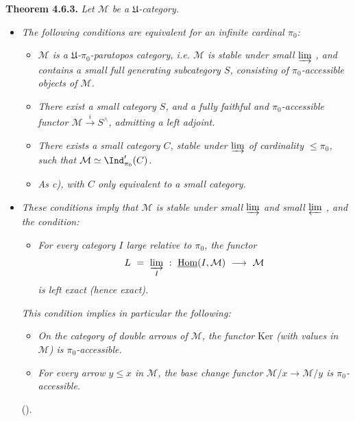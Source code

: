 \textbf{Theorem 4.6.3.} \textit{Let $\mathcal{M}$ be a $\mathfrak{U}$-category.}
\begin{itemize}[leftmargin=2.5em]
\item[\circled{1\textsuperscript{\textit{o}}}] \textit{The following conditions are equivalent for an infinite cardinal $\pi_0$:}
\begin{itemize}[leftmargin=3em]
\item[$a_{\pi_0}$\textit{)}] \textit{$\mathcal{M}$ is a $\mathfrak{U}$-$\pi_0$-paratopos category, i.e. $\mathcal{M}$ is stable under small $\varinjlim$ , and contains a small full} \textit{generating subcategory $S$, consisting of $\pi_0$-accessible objects of $\mathcal{M}$.}


\item[$b_{\pi_0}$\textit{)}] \textit{There exist a small category $S$, and a fully faithful and $\pi_0$-accessible functor $\mathcal{M}\xrightarrow{\ i\ }S^{\wedge}$, admitting a left adjoint.}
\item[$c_{\pi_0}$\textit{)}] \textit{There exists a small category $C$, stable under $\varinjlim$ of cardinality $\leqslant\pi_0$, such that $\mathcal{M}\simeq\Ind'_{\pi_0}(C)$.}
\item[$c'_{\pi_0}$\textit{)}] \textit{As c), with $C$ only equivalent to a small category.}
\end{itemize}
\item[\textit{2°)}] \textit{These conditions imply that $\mathcal{M}$ is stable under small $\varinjlim$ and small $\varprojlim$ , and the condition:}
\begin{itemize}[leftmargin=3em]
\item[$e_{\pi_0}$\textit{)}] \textit{For every category $I$ large relative to $\pi_0$, the functor}
\[
L \ =\ \varinjlim_{I}\ :\ \underline{\operatorname{Hom}}(I,\mathcal{M}) \ \longrightarrow\ \mathcal{M}
\]
\textit{is left exact (hence exact).}
\end{itemize}
\textit{This condition implies in particular the following:}
\begin{itemize}[leftmargin=3em]
\item[$\alpha(\pi_0)$] \textit{On the category of double arrows of $\mathcal{M}$, the functor} Ker \textit{(with values in $\mathcal{M}$) is $\pi_0$-accessible.}
\item[$\beta(\pi_0)$] \textit{For every arrow $y\leqslant x$ in $\mathcal{M}$, the base change functor $\mathcal{M}/x\longrightarrow\mathcal{M}/y$ is $\pi_0$-accessible.}
\end{itemize}
(\footnotemark[59]). %


\end{itemize}
